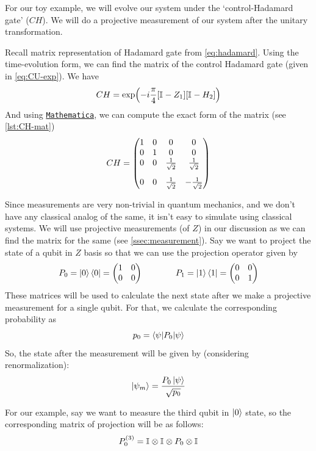 \documentclass[11pt, oneside, listof=totoc]{scrbook}
\renewcommand{\u}{0}
\renewcommand{\d}{1}
\newcommand{\ku}{\ket{0}}
\newcommand{\kd}{\ket{1}}
\begin{document}
\noindent For our toy example, we will evolve our system under the `control-Hadamard gate' ($CH$). We will do a projective measurement of our system after the unitary transformation.

Recall matrix representation of Hadamard gate from \cref{eq:hadamard}. Using the time-evolution form, we can find the matrix of the control Hadamard gate (given in \cref{eq:CU-exp}). We have
\begin{equation*}
    CH = \exp(- i \frac{\pi}{4} [\mathbb{I}_{} - Z_1][\mathbb{I}_{} - H_2])
\end{equation*}
And using \href{https://www.wolfram.com/mathematica/}{\texttt{Mathematica}}, we can compute the exact form of the matrix (see \cref{lst:CH-mat})
\begin{equation}
    CH = \mqty(
    1 & 0 & 0 & 0 \\
    0 & 1 & 0 & 0 \\
    0 & 0 & \frac{1}{\sqrt{2}} & \frac{1}{\sqrt{2}} \\[2.5ex]
    0 & 0 & \frac{1}{\sqrt{2}} & - \frac{1}{\sqrt{2}}
    )
\end{equation}

Since measurements are very non-trivial in quantum mechanics, and we don't have any classical analog of the same, it isn't easy to simulate using classical systems. We will use projective measurements (of \(Z\)) in our discussion as we can find the matrix for the same (see \cref{ssec:measurement}). Say we want to project the state of a qubit in \(Z\) basis so that we can use the projection operator given by
\begin{equation*}
    P_{\u} = \ku \bra{\u} = \mqty(1 & 0 \\ 0 & 0) \qquad \qquad P_{\d} = \kd \bra{\d} = \mqty(0 & 0 \\ 0 & 1)
\end{equation*}
These matrices will be used to calculate the next state after we make a projective measurement for a single qubit. For that, we calculate the corresponding probability as
\begin{equation*}
    p_\u = \ev**{P_{\u}}{\psi}
\end{equation*}
So, the state after the measurement will be given by (considering renormalization):
\begin{equation}
    \ket{\psi_m} = \frac{{P_{\u}} \ket{\psi}}{\sqrt{p_\u}}
\end{equation}

For our example, say we want to measure the third qubit in \(\ku\) state, so the corresponding matrix of projection will be as follows:
\begin{equation*}
    P_{\u}^{(3)} = \I{} \otimes \I{} \otimes P_{\u} \otimes \I{}
\end{equation*}
\end{document}
